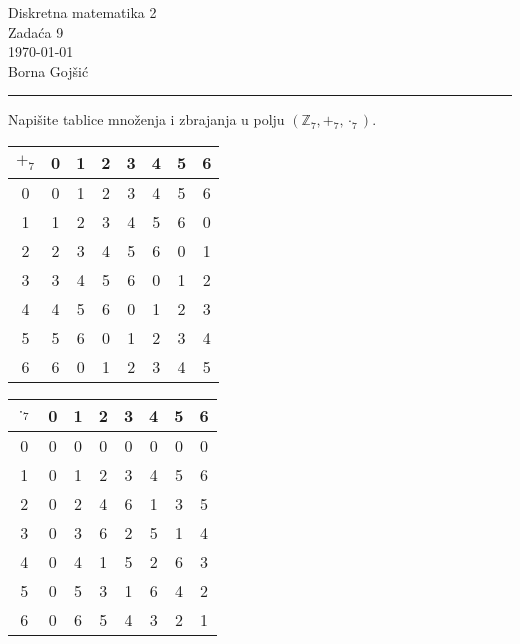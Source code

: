 \documentclass{exam}
\def \brojZadace {9}
\begin{document}
\begingroup
\centering
\LARGE Diskretna matematika 2\\
\Large Zadaća \brojZadace\\
\large \today\\
\large Borna Gojšić\par
\endgroup
\rule{\textwidth}{0.4pt}
\pointsdroppedatright   %
\printanswers
\renewcommand{\solutiontitle}{\noindent\textbf{Rj:}\enspace}   %

\begin{questions}

\question Napišite tablice množenja i zbrajanja u polju $(\mathbb{Z}_7, +_7, \cdot_7)$.

\begin{solution}
  \begin{tabular}{|c|ccccccc|}
    \hline
    $+_7$ & 0 & 1 & 2 & 3 & 4 & 5 & 6 \\
    \hline
    0 & 0 & 1 & 2 & 3 & 4 & 5 & 6 \\
    1 & 1 & 2 & 3 & 4 & 5 & 6 & 0 \\
    2 & 2 & 3 & 4 & 5 & 6 & 0 & 1 \\
    3 & 3 & 4 & 5 & 6 & 0 & 1 & 2 \\
    4 & 4 & 5 & 6 & 0 & 1 & 2 & 3 \\
    5 & 5 & 6 & 0 & 1 & 2 & 3 & 4 \\
    6 & 6 & 0 & 1 & 2 & 3 & 4 & 5 \\
    \hline
  \end{tabular} \quad
  \begin{tabular}{|c|ccccccc|}
    \hline
    $\cdot_7$ & 0 & 1 & 2 & 3 & 4 & 5 & 6 \\
    \hline
    0 & 0 & 0 & 0 & 0 & 0 & 0 & 0 \\
    1 & 0 & 1 & 2 & 3 & 4 & 5 & 6 \\
    2 & 0 & 2 & 4 & 6 & 1 & 3 & 5 \\
    3 & 0 & 3 & 6 & 2 & 5 & 1 & 4 \\
    4 & 0 & 4 & 1 & 5 & 2 & 6 & 3 \\
    5 & 0 & 5 & 3 & 1 & 6 & 4 & 2 \\
    6 & 0 & 6 & 5 & 4 & 3 & 2 & 1 \\
    \hline
  \end{tabular}
\end{solution}

\question
{}
\end{questions}
\end{document}
